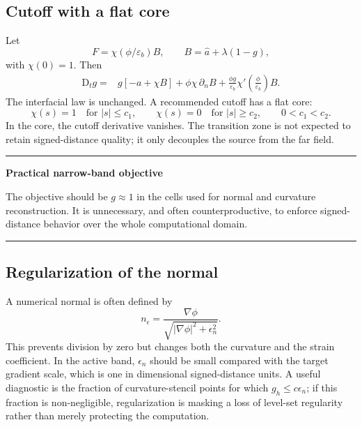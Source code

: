 \documentclass[11pt,a4paper]{article}
\theoremstyle{definition}
\theoremstyle{remark}
\newcommand{\abs}[1]{\left\lvert #1\right\rvert}
\newcommand{\material}{\mathrm{D}_t}
\newenvironment{keybox}[1]{%
  \begin{center}\begin{minipage}{0.94\textwidth}
  \color{noteblue}\hrule\vspace{0.5em}
  \textbf{#1}\par\color{black}\vspace{0.3em}
}{%
  \vspace{0.4em}\color{noteblue}\hrule\color{black}
  \end{minipage}\end{center}
}
\begin{document}
\subsection{Cutoff with a flat core}

Let
\begin{equation}
  F=\chi(\phi/\varepsilon_b)B,
  \qquad
  B=\widehat a+\lambda(1-g),
  \label{eq:cutoff-F}
\end{equation}
with $\chi(0)=1$. Then
\begin{align}
  \material g
  ={}&g\left[-a+\chi B\right]
  +\phi\chi\,\partial_nB
  +\frac{\phi g}{\varepsilon_b}\chi'\!\left(\frac{\phi}{\varepsilon_b}\right)B.
  \label{eq:cutoff-g}
\end{align}
The interfacial law is unchanged. A recommended cutoff has a flat core:
\begin{equation}
  \chi(s)=1\quad\text{for }\abs s\le c_1,
  \qquad
  \chi(s)=0\quad\text{for }\abs s\ge c_2,
  \qquad 0<c_1<c_2.
\end{equation}
In the core, the cutoff derivative vanishes. The transition zone is not expected to retain signed-distance quality; it only decouples the source from the far field.

\begin{keybox}{Practical narrow-band objective}
The objective should be $g\approx1$ in the cells used for normal and curvature reconstruction. It is unnecessary, and often counterproductive, to enforce signed-distance behavior over the whole computational domain.
\end{keybox}

\subsection{Regularization of the normal}

A numerical normal is often defined by
\begin{equation}
  n_\epsilon=\frac{\nabla\phi}{\sqrt{\abs{\nabla\phi}^2+\epsilon_n^2}}.
  \label{eq:regularized-normal}
\end{equation}
This prevents division by zero but changes both the curvature and the strain coefficient. In the active band, $\epsilon_n$ should be small compared with the target gradient scale, which is one in dimensional signed-distance units. A useful diagnostic is the fraction of curvature-stencil points for which $g_h\le c\epsilon_n$; if this fraction is non-negligible, regularization is masking a loss of level-set regularity rather than merely protecting the computation.
\end{document}
